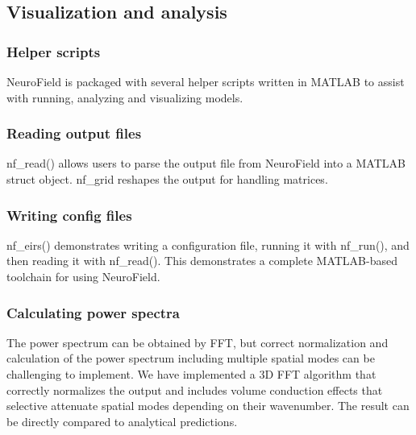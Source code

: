 \documentclass[preprint,review,10pt,authoryear,letterpaper]{elsarticle}
\begin{document}
\subsection{Visualization and analysis}

\subsubsection{Helper scripts}
NeuroField is packaged with several helper scripts written in MATLAB to assist with running, analyzing and visualizing models. 

\subsubsection{Reading output files}
nf\_read() allows users to parse the output file from NeuroField into a MATLAB struct object.
nf\_grid reshapes the output for handling matrices. 

\subsubsection{Writing config files}
nf\_eirs() demonstrates writing a configuration file, running it with nf\_run(), and then reading it with nf\_read(). This demonstrates a complete MATLAB-based toolchain for using NeuroField.

\subsubsection{Calculating power spectra}
\label{sec:spectrum_3d}
The power spectrum can be obtained by FFT, but correct normalization and calculation of the power spectrum including multiple spatial modes can be challenging to implement. We have implemented a 3D FFT algorithm that correctly normalizes the output and includes volume conduction effects that selective attenuate spatial modes depending on their wavenumber. The result can be directly compared to analytical predictions.
\end{document}
